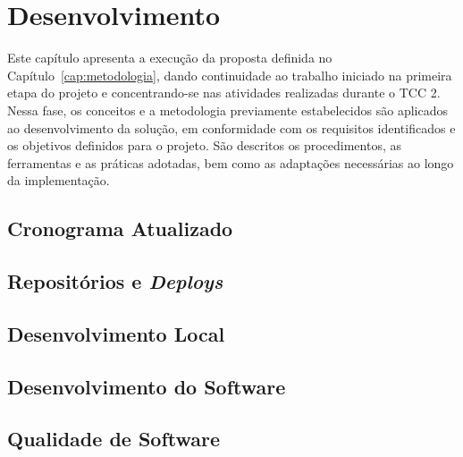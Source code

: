 \chapter{Desenvolvimento}

Este capítulo apresenta a execução da proposta definida no Capítulo~\ref{cap:metodologia}, dando continuidade ao trabalho iniciado na primeira etapa do projeto e concentrando-se nas atividades realizadas durante o TCC 2. Nessa fase, os conceitos e a metodologia previamente estabelecidos são aplicados ao desenvolvimento da solução, em conformidade com os requisitos identificados e os objetivos definidos para o projeto. São descritos os procedimentos, as ferramentas e as práticas adotadas, bem como as adaptações necessárias ao longo da implementação.


\section{Cronograma Atualizado}


\section{Repositórios e \textit{Deploys}}


\section{Desenvolvimento Local}


\section{Desenvolvimento do Software}


\section{Qualidade de Software}
